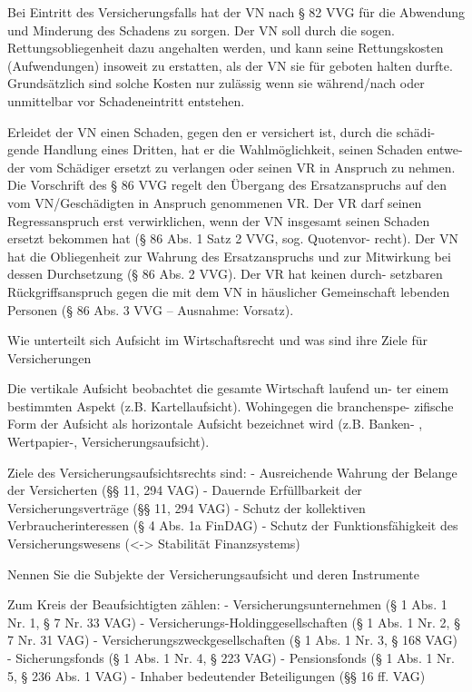Bei Eintritt des Versicherungsfalls hat der VN nach § 82 VVG für die Abwendung
und Minderung des Schadens zu sorgen. Der VN soll durch die sogen. Rettungsobliegenheit dazu angehalten werden,
und kann seine Rettungskosten (Aufwendungen) insoweit zu erstatten, als der VN sie
für geboten halten durfte. Grundsätzlich sind solche Kosten nur zulässig wenn sie während/nach oder unmittelbar vor Schadeneintritt entstehen.

Erleidet der VN einen Schaden, gegen den er versichert ist, durch die schädi-
gende Handlung eines Dritten, hat er die Wahlmöglichkeit, seinen Schaden entwe-
der vom Schädiger ersetzt zu verlangen oder seinen VR in Anspruch zu nehmen.
Die Vorschrift des § 86 VVG regelt den Übergang des Ersatzanspruchs auf den
vom VN/Geschädigten in Anspruch genommenen VR.
Der VR darf seinen Regressanspruch erst verwirklichen, wenn der VN insgesamt
seinen Schaden ersetzt bekommen hat (§ 86 Abs. 1 Satz 2 VVG, sog. Quotenvor-
recht). Der VN hat die Obliegenheit zur Wahrung des Ersatzanspruchs und zur
Mitwirkung bei dessen Durchsetzung (§ 86 Abs. 2 VVG). Der VR hat keinen durch-
setzbaren Rückgriffsanspruch gegen die mit dem VN in häuslicher Gemeinschaft
lebenden Personen (§ 86 Abs. 3 VVG – Ausnahme: Vorsatz).


Wie unterteilt sich Aufsicht im Wirtschaftsrecht und was sind ihre Ziele für Versicherungen 

Die vertikale Aufsicht beobachtet die gesamte Wirtschaft laufend un-
ter einem bestimmten Aspekt (z.B. Kartellaufsicht). Wohingegen die branchenspe-
zifische Form der Aufsicht als horizontale Aufsicht bezeichnet wird (z.B. Banken-
, Wertpapier-, Versicherungsaufsicht).

Ziele des Versicherungsaufsichtsrechts sind:
- Ausreichende Wahrung der Belange der Versicherten (§§ 11, 294 VAG)
- Dauernde Erfüllbarkeit der Versicherungsverträge (§§ 11, 294 VAG)
- Schutz der kollektiven Verbraucherinteressen (§ 4 Abs. 1a FinDAG)
- Schutz der Funktionsfähigkeit des Versicherungswesens (<-> Stabilität Finanzsystems)


Nennen Sie die Subjekte der Versicherungsaufsicht und deren Instrumente

Zum Kreis der Beaufsichtigten zählen:
- Versicherungsunternehmen (§ 1 Abs. 1 Nr. 1, § 7 Nr. 33 VAG)
- Versicherungs-Holdinggesellschaften (§ 1 Abs. 1 Nr. 2, § 7 Nr. 31 VAG)
- Versicherungszweckgesellschaften (§ 1 Abs. 1 Nr. 3, § 168 VAG)
- Sicherungsfonds (§ 1 Abs. 1 Nr. 4, § 223 VAG)
- Pensionsfonds (§ 1 Abs. 1 Nr. 5, § 236 Abs. 1 VAG)
- Inhaber bedeutender Beteiligungen (§§ 16 ff. VAG)

